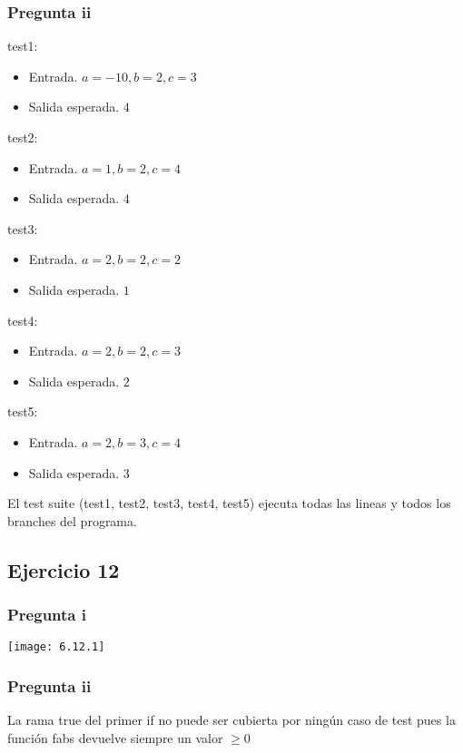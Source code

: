 \subsubsection{Pregunta ii}
test1:
\begin{itemize}
    \item Entrada. $ a = -10, b = 2, c = 3 $
    \item Salida esperada. $ 4 $
\end{itemize}

test2:
\begin{itemize}
    \item Entrada. $ a = 1, b = 2, c = 4 $
    \item Salida esperada. $ 4 $
\end{itemize}

test3:
\begin{itemize}
    \item Entrada. $ a = 2, b = 2, c = 2 $
    \item Salida esperada. $ 1 $
\end{itemize}

test4:
\begin{itemize}
    \item Entrada. $ a = 2, b = 2, c = 3 $
    \item Salida esperada. $ 2 $
\end{itemize}

test5:
\begin{itemize}
    \item Entrada. $ a = 2, b = 3, c = 4 $
    \item Salida esperada. $ 3 $
\end{itemize}

El test suite (test1, test2, test3, test4, test5) ejecuta todas las lineas y todos los branches del programa.

\subsection{Ejercicio 12}
\subsubsection{Pregunta i}
\texttt{[image: 6.12.1]}

\subsubsection{Pregunta ii}
La rama true del primer if no puede ser cubierta por ningún caso de test pues la función fabs devuelve siempre un valor $ \geq 0 $

